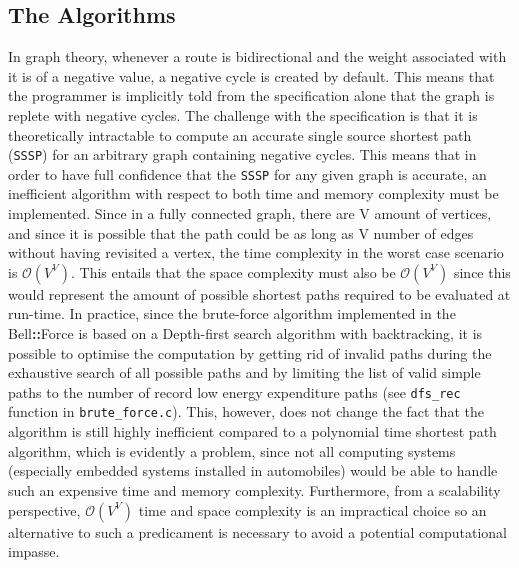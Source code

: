 \documentclass[11pt]{article}
\newcommand{\bellforce}{Bell\hspace*{1.61803398875pt}\textbf{::}\hspace*{1.61803398875pt}Force}
\begin{document}
\subsection{The Algorithms}
In graph theory, whenever a route is bidirectional and the weight associated with it is of a negative value, a negative cycle is created by default. This means that the programmer is implicitly told from the specification alone that the graph is replete with negative cycles. The challenge with the specification is that it is theoretically intractable to compute an accurate single source shortest path (\texttt{SSSP}) for an arbitrary graph containing negative cycles\cite{Sedgewick}. This means that in order to have full confidence that the \texttt{SSSP} for any given graph is accurate, an inefficient algorithm with respect to both time and memory complexity must be implemented. Since in a fully connected graph, there are V amount of vertices, and since it is possible that the path could be as long as V number of edges without having revisited a vertex, the time complexity in the worst case scenario is $\mathcal{O}(V^V)$. This entails that the space complexity must also be $\mathcal{O}(V^V)$ since this would represent the amount of possible shortest paths required to be evaluated at run-time. In practice, since the brute-force algorithm implemented in the \bellforce{} is based on a Depth-first search algorithm with backtracking, it is possible to optimise the computation by getting rid of invalid paths during the exhaustive search of all possible paths and by limiting the list of valid simple paths to the number of record low energy expenditure paths (see \texttt{dfs\_rec} function in \texttt{brute\_force.c}). This, however, does not change the fact that the algorithm is still highly inefficient compared to a polynomial time shortest path algorithm, which is evidently a problem, since not all computing systems (especially embedded systems installed in automobiles) would be able to handle such an expensive time and memory complexity. Furthermore, from a scalability perspective, $\mathcal{O}(V^V)$ time and space complexity is an impractical choice so an alternative to such a predicament is necessary to avoid a potential computational impasse. 
\end{document}
